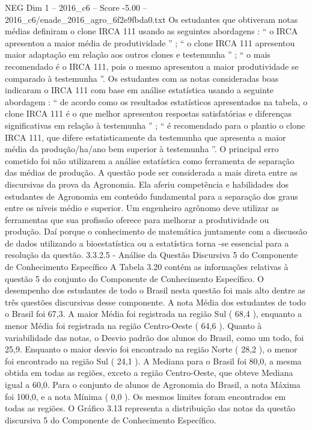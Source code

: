 \begin{textsample}{NEG Dim 1 – 2016\_c6 – Score -5.00 – 2016\_c6/enade\_2016\_agro\_6f2e9fbda0.txt}
Os estudantes que obtiveram notas médias definiram o clone IRCA 111 usando as seguintes abordagens : “ o IRCA apresentou a maior média de produtividade ” ; “ o clone IRCA 111 apresentou maior adaptação em relação aos outros clones e testemunha ” ; “ o mais recomendado é o IRCA 111, pois o mesmo apresentou a maior produtividade se comparado à testemunha ”.
Os estudantes com as notas consideradas boas indicaram o IRCA 111 com base em análise estatística usando a seguinte abordagem : “ de acordo como os resultados estatísticos apresentados na tabela, o clone IRCA 111 é o que melhor apresentou respostas satisfatórias e diferenças significativas em relação à testemunha ” ; “ é recomendado para o plantio o clone IRCA 111, que difere estatisticamente da testemunha que apresenta a maior média da produção/ha/ano bem superior à testemunha ”.
O principal erro cometido foi não utilizarem a análise estatística como ferramenta de separação das médias de produção.
A questão pode ser considerada a mais direta entre as discursivas da prova da Agronomia.
Ela aferiu competência e habilidades dos estudantes de Agronomia em conteúdo fundamental para a separação dos graus entre os níveis médio e superior.
Um engenheiro agrônomo deve utilizar as ferramentas que sua profissão oferece para melhorar a produtividade ou produção.
Daí porque o conhecimento de matemática juntamente com a discussão de dados utilizando a bioestatística ou a estatística torna -se essencial para a resolução da questão. 3.3.2.5 - Análise da Questão Discursiva 5 do Componente de Conhecimento Específico A Tabela 3.20 contém as informações relativas à questão 5 do conjunto do Componente de Conhecimento Específico.
O desempenho dos estudantes de todo o Brasil nesta questão foi mais alto dentre as três questões discursivas desse componente.
A nota Média dos estudantes de todo o Brasil foi 67,3.
A maior Média foi registrada na região Sul ( 68,4 ), enquanto a menor Média foi registrada na região Centro-Oeste ( 64,6 ).
Quanto à variabilidade das notas, o Desvio padrão dos alunos do Brasil, como um todo, foi 25,9.
Enquanto o maior desvio foi encontrado na região Norte ( 28,2 ), o menor foi encontrado na região Sul ( 24,1 ).
A Mediana para o Brasil foi 80,0, a mesma obtida em todas as regiões, exceto a região Centro-Oeste, que obteve Mediana igual a 60,0.
Para o conjunto de alunos de Agronomia do Brasil, a nota Máxima foi 100,0, e a nota Mínima ( 0,0 ).
Os mesmos limites foram encontrados em todas as regiões.
O Gráfico 3.13 representa a distribuição das notas da questão discursiva 5 do Componente de Conhecimento Específico.

\end{textsample}
